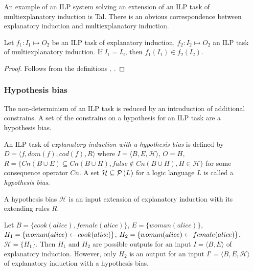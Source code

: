 An example of an ILP system solving an extension of an ILP task of multiexplanatory induction is Tal. There is an obvious correspondence between explanatory induction and multiexplanatory induction.

\begin{proposition}
Let $f_1:I_1 \mapsto O_2$ be an ILP task of explanatory induction, $f_2:I_2 \mapsto O_2$ an ILP task of multiexplanatory induction. If $I_1=I_2$, then
$f_1(I_1) \in f_2(I_2)$.
\end{proposition}

\begin{proof}
Follows from the definitions , .
\end{proof}

\subsubsection{Hypothesis bias}
The non-determinism of an ILP task is reduced by an introduction of additional constrains. A set of the constrains on a hypothesis for an ILP task are a hypothesis bias.

\begin{defn}
An ILP task of \emph{explanatory induction with a hypothesis bias} is defined by $D=\langle f, dom(f), cod(f), R \rangle$ where $I=\langle B, E, \mathcal{H}\rangle$, $O=H$,
$R=\{Cn(B \cup E) \subseteq Cn(B \cup H), false \not\in Cn(B \cup H), H \in \mathcal{H}\}$ for some consequence operator $Cn$. A set $\mathcal{H} \subseteq \mathcal{P} \left({ L }\right)$ for a logic language $L$ is called a \emph{hypothesis bias}.
\end{defn}

\begin{remark}
A hypothesis bias $\mathcal{H}$ is an input extension of explanatory induction with its extending rules $R$.
\end{remark}

\begin{exmp}\label{explanatory_induction_hypothesis_bias}
Let $B = \{cook(alice), female(alice)\}$, $E=\{woman(alice)\}$,
$H_1=\{woman(alice) \leftarrow cook(alice)\}$,
$H_2=\{woman(alice) \leftarrow female(alice)\}$,
$\mathcal{H}=\{H_1\}$.
Then $H_1$ and $H_2$ are possible outputs for an input $I=\langle B, E\rangle$ of explanatory induction. However, only $H_2$ is an output for an input $I'=\langle B, E, \mathcal{H}\rangle$ of explanatory induction with a hypothesis bias.
\end{exmp}


